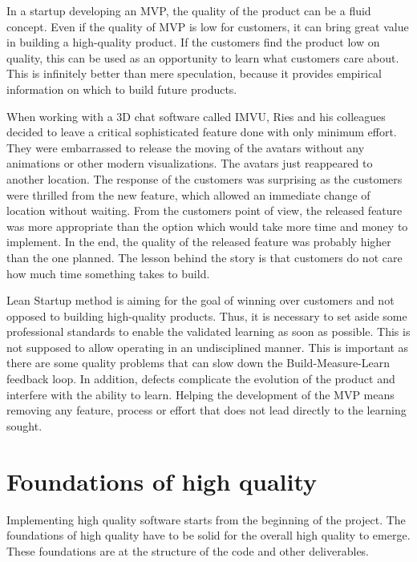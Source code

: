 In a startup developing an MVP, the quality of the product can be a fluid concept. Even if the quality of MVP is low for customers, it can bring great value in building a high-quality product. If the customers find the product low on quality, this can be used as an opportunity to learn what customers care about. This is infinitely better than mere speculation, because it provides empirical information on which to build future products.~\cite{ries2011lean}

When working with a 3D chat software called IMVU, Ries and his colleagues decided to leave a critical sophisticated feature done with only minimum effort. They were embarrassed to release the moving of the avatars without any animations or other modern visualizations. The avatars just reappeared to another location. The response of the customers was surprising as the customers were thrilled from the new feature, which allowed an immediate change of location without waiting. From the customers point of view, the released feature was more appropriate than the option which would take more time and money to implement. In the end, the quality of the released feature was probably higher than the one planned. The lesson behind the story is that customers do not care how much time something takes to build.~\cite{ries2011lean}

Lean Startup method is aiming for the goal of winning over customers and not opposed to building high-quality products. Thus, it is necessary to set aside some professional standards to enable the validated learning as soon as possible. This is not supposed to allow operating in an undisciplined manner. This is important as there are some quality problems that can slow down the Build-Measure-Learn feedback loop. In addition, defects complicate the evolution of the product and interfere with the ability to learn. Helping the development of the MVP means removing any feature, process or effort that does not lead directly to the learning sought.~\cite{ries2011lean}

\section{Foundations of high quality}
\label{sec:foundations_quality}

Implementing high quality software starts from the beginning of the project. The foundations of high quality have to be solid for the overall high quality to emerge. These foundations are at the structure of the code and other deliverables.

